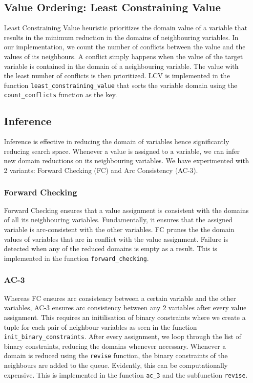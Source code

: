 \documentclass[runningheads]{llncs}
\begin{document}
\subsection{Value Ordering: Least Constraining Value}

Least Constraining Value heuristic prioritizes the domain value of a variable that results in the minimum reduction in the domains of neighbouring variables. In our implementation, we count the number of conflicts between the value and the values of its neighbours. A conflict simply happens when the value of the target variable is contained in the domain of a neighbouring variable. The value with the least number of conflicts is then prioritized. LCV is implemented in the function \verb`least_constraining_value` that sorts the variable domain using the \verb`count_conflicts` function as the key.


\subsection{Inference}

Inference is effective in reducing the domain of variables hence significantly reducing search space. Whenever a value is assigned to a variable, we can infer new domain reductions on its neighbouring variables. We have experimented with 2 variants: Forward Checking (FC) and Arc Consistency (AC-3). 


\subsubsection{Forward Checking}

Forward Checking ensures that a value assignment is consistent with the domains of all its neighbouring variables. Fundamentally, it ensures that the assigned variable is arc-consistent with the other variables. FC prunes the the domain values of variables that are in conflict with the value assignment. Failure is detected when any of the reduced domains is empty as a result. This is implemented in the function \verb`forward_checking`.

\subsubsection{AC-3}

Whereas FC ensures arc consistency between a certain variable and the other variables, AC-3 ensures arc consistency between any 2 variables after every value assignment. This requires an initilisation of binary constraints where we create a tuple for each pair of neighbour variables as seen in the function \verb`init_binary_constraints`. After every assignment, we loop through the list of binary constraints, reducing the domains whenever necessary. Whenever a domain is reduced using the \verb`revise` function, the binary constraints of the neighbours are added to the queue. Evidently, this can be computationally expensive. This is implemented in the function  \verb`ac_3` and the subfunction \verb`revise`. 
\end{document}
